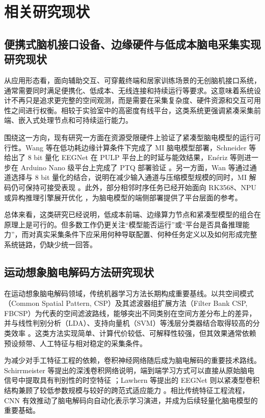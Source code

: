 \section{相关研究现状}
\subsection{便携式脑机接口设备、边缘硬件与低成本脑电采集实现研究现状}

从应用形态看，面向辅助交互、可穿戴终端和居家训练场景的无创脑机接口系统，通常需要同时满足便携化、低成本、无线连接和持续运行等要求。这意味着系统设计不再只是追求更完整的空间观测，而是需要在采集复杂度、硬件资源和交互可用性之间进行权衡。相较于实验室中的高密度有线平台，这类系统更强调紧凑采集前端、嵌入式处理节点和可持续运行能力。

围绕这一方向，现有研究一方面在资源受限硬件上验证了紧凑型脑电模型的运行可行性。Wang 等在低功耗边缘计算条件下完成了 MI 脑电模型部署，Schneider 等给出了 8 bit 量化 EEGNet 在 PULP 平台上的时延与能效结果，En\'eriz 等则进一步在 Arduino Nano 级平台上完成了 PTQ 部署验证 \cite{Wan20, Sch20, Ene23}。另一方面，Wan 等通过通道选择与 8 bit 量化的结合，说明在减少输入通道与压缩模型规模的同时，MI 解码仍可保持可接受表现 \cite{Wan22b}。此外，部分相邻时序任务已经开始面向 RK3568、NPU 或异构推理引擎展开优化 \cite{You24, Ism23}，为脑电模型的端侧部署提供了平台层面的参考。

总体来看，这类研究已经说明，低成本前端、边缘算力节点和紧凑型模型的组合在原理上是可行的。但多数工作仍更关注“模型能否运行”或“平台是否具备推理能力”，而对真实采集条件下应采用何种导联配置、何种任务定义以及如何形成完整系统链路，仍缺少统一回答。

\subsection{运动想象脑电解码方法研究现状}

在运动想象脑电解码领域，传统机器学习方法长期构成重要基线。以共空间模式（Common Spatial Pattern, CSP）及其滤波器组扩展方法（Filter Bank CSP, FBCSP）为代表的空间滤波路线，能够突出不同类别在空间方差分布上的差异，并与线性判别分析（LDA）、支持向量机（SVM）等浅层分类器结合取得较高的分类效率 \cite{ang2012filter, lotte2018review}。这类方法实现简单、计算代价较低、可解释性较强，但其效果通常依赖预设频带、人工特征与相对稳定的采集条件。

为减少对手工特征工程的依赖，卷积神经网络随后成为脑电解码的重要技术路线。Schirrmeister 等提出的深浅卷积网络说明，端到端学习方式可以直接从原始脑电信号中提取具有判别性的时空特征 \cite{schirrmeister2017deep}；Lawhern 等提出的 EEGNet 则以紧凑型卷积结构兼顾了较低参数规模与较好的跨范式适应能力 \cite{lawhern2018eegnet}。相比传统特征工程流程，CNN 有效推动了脑电解码向自动化表示学习演进，并成为后续轻量化脑电模型的重要基础。

